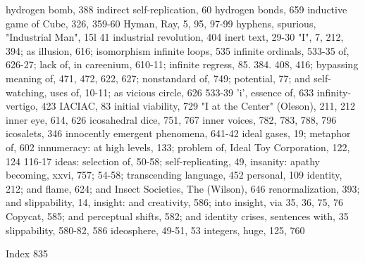 hydrogen bomb, 388                                  indirect self-replication, 60
hydrogen bonds, 659                                 inductive game of Cube, 326, 359-60
Hyman, Ray, 5, 95, 97-99 hyphens, spurious,         "Industrial Man", 15l
  41                                                industrial revolution, 404
                                                    inert text, 29-30
"I", 7, 212, 394; as illusion, 616; isomorphism     infinite loops, 535 infinite ordinals, 533-35
  of, 626-27; lack of, in careenium, 610-11;        infinite regress, 85. 384. 408, 416; bypassing
  meaning of, 471, 472, 622, 627; nonstandard         of, 749; potential, 77; and self-watching,
  uses of, 10-11; as vicious circle, 626              533-39
'i', essence of, 633                                infinity-vertigo, 423
IACIAC, 83                                          initial viability, 729
"I at the Center" (Oleson), 211, 212                inner eye, 614, 626
icosahedral dice, 751, 767                          inner voices, 782, 783, 788, 796
icosalets, 346                                      innocently emergent phenomena, 641-42
ideal gases, 19; metaphor of, 602                   innumeracy: at high levels, 133; problem of,
Ideal Toy Corporation, 122, 124                       116-17
ideas: selection of, 50-58; self-replicating, 49,   insanity: apathy becoming, xxvi, 757;
  54-58; transcending language, 452                   personal, 109
identity, 212; and flame, 624; and                  Insect Societies, The (Wilson), 646
  renormalization, 393; and slippability, 14,       insight: and creativity, 586; into insight, via
  35, 36, 75, 76                                      Copycat, 585; and perceptual shifts, 582; and
identity crises, sentences with, 35                   slippability, 580-82, 586
ideosphere, 49-51, 53                               integers, huge, 125, 760

 Index                                                                                          835

